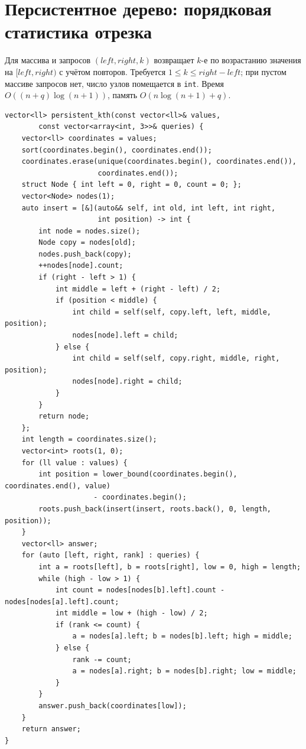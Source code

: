 \section{Персистентное дерево: порядковая статистика отрезка}
Для массива и запросов $(left,right,k)$ возвращает $k$-е по возрастанию значения на $[left,right)$ с учётом повторов.
Требуется $1\le k\le right-left$; при пустом массиве запросов нет, число узлов помещается в \texttt{int}.
Время $O((n+q)\log(n+1))$, память $O(n\log(n+1)+q)$.
\begin{lstlisting}[name=persistent_kth]
vector<ll> persistent_kth(const vector<ll>& values,
        const vector<array<int, 3>>& queries) {
    vector<ll> coordinates = values;
    sort(coordinates.begin(), coordinates.end());
    coordinates.erase(unique(coordinates.begin(), coordinates.end()),
                      coordinates.end());
    struct Node { int left = 0, right = 0, count = 0; };
    vector<Node> nodes(1);
    auto insert = [&](auto&& self, int old, int left, int right,
                      int position) -> int {
        int node = nodes.size();
        Node copy = nodes[old];
        nodes.push_back(copy);
        ++nodes[node].count;
        if (right - left > 1) {
            int middle = left + (right - left) / 2;
            if (position < middle) {
                int child = self(self, copy.left, left, middle, position);
                nodes[node].left = child;
            } else {
                int child = self(self, copy.right, middle, right, position);
                nodes[node].right = child;
            }
        }
        return node;
    };
    int length = coordinates.size();
    vector<int> roots(1, 0);
    for (ll value : values) {
        int position = lower_bound(coordinates.begin(), coordinates.end(), value)
                     - coordinates.begin();
        roots.push_back(insert(insert, roots.back(), 0, length, position));
    }
    vector<ll> answer;
    for (auto [left, right, rank] : queries) {
        int a = roots[left], b = roots[right], low = 0, high = length;
        while (high - low > 1) {
            int count = nodes[nodes[b].left].count - nodes[nodes[a].left].count;
            int middle = low + (high - low) / 2;
            if (rank <= count) {
                a = nodes[a].left; b = nodes[b].left; high = middle;
            } else {
                rank -= count;
                a = nodes[a].right; b = nodes[b].right; low = middle;
            }
        }
        answer.push_back(coordinates[low]);
    }
    return answer;
}
\end{lstlisting}
%

